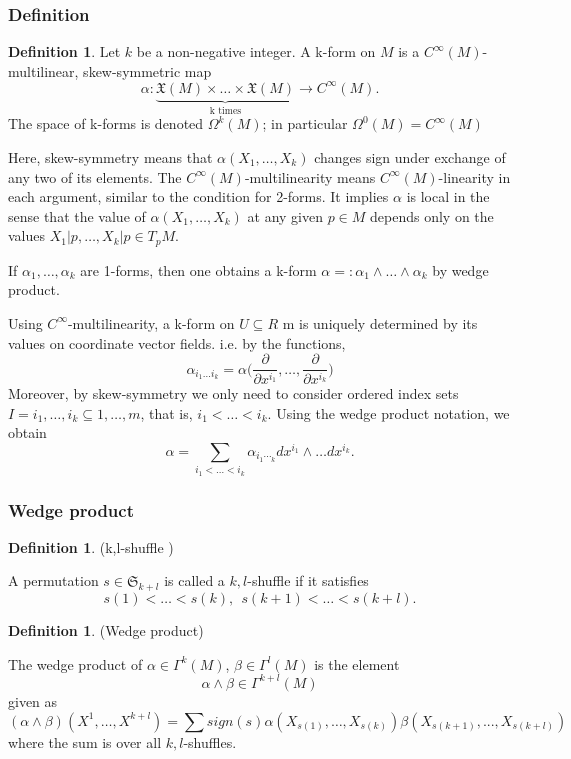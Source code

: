 \documentclass{article}
\theoremstyle{definition}
\newtheorem{defn}[theorem]{Definition}
\newenvironment{definition}
  {\vspace{8pt}\begin{mdframed}[backgroundcolor=blueish,innertopmargin=4]\begin{defn}}
  {\end{defn}\end{mdframed}\vspace{4pt}}
\begin{document}
\subsubsection{Definition}
\begin{definition}
Let $k$ be a non-negative integer. A k-form on $M$ is a $C^\infty(M)$-multilinear, skew-symmetric map
\[
    \alpha : \underbrace{\mathfrak X(M) \times \dots \times \mathfrak X(M)}_\text{k times} \rightarrow C^\infty (M).
\]
The space of k-forms is denoted $\Omega^k (M)$; in particular $\Omega^0 (M) = C^\infty(M)$
\end{definition}

Here, skew-symmetry means that $\alpha(X_1,\dots, X_k)$ changes sign under exchange of any two of its elements.  The $C^\infty(M)$-multilinearity means $C^\infty(M)$-linearity in each argument, similar to the condition for 2-forms. It implies $\alpha$ is local in the sense that the value of $\alpha(X_1,\dots,X_k)$ at any given $p \in M$ depends only on the values $X_1|p,\dots,X_k |p \in T_pM$. 

If $\alpha_1,\dots,\alpha_k$ are 1-forms, then one obtains a k-form $\alpha =: \alpha_1\wedge\dots\wedge\alpha_k$ by wedge product.

Using $C^\infty$-multilinearity, a k-form on $U \subseteq R$ m is uniquely determined by its values on coordinate vector fields. i.e. by the functions,
\[
    \alpha_{i_1\dots i_k} = \alpha \bigg ( \frac{\partial}{\partial x^{i_1}}, \dots , \frac{\partial}{ \partial x ^{i_k}} \bigg )
\]
Moreover, by skew-symmetry we only need to consider ordered index sets $I = {i_1,\dots,i_k} \subseteq {1,\dots,m}$, that is, $i_1 < \dots < i_k$. Using the wedge product notation, we obtain
\[
\alpha = \sum_{i_1<\dots<i_k} \alpha_{i_1\dotsi_k} dx^{i_1} \wedge \dots dx^{i_k}.
\]

\subsubsection{Wedge product}

\begin{definition} (k,l-shuffle )

A permutation $s \in \mathfrak S_{k+l}$ is called a $k,l$-shuffle if it satisfies
\[
   s(1) < \dots < s(k), \ \ s(k +1) < \dots < s(k +l).
\]
\end{definition}

\begin{definition} (Wedge product)

The wedge product of $\alpha  \in  \Gamma^k (M)$, $\beta  \in  \Gamma^l (M)$ is the element
\[
    \alpha \wedge \beta \in  \Gamma^{k+l} (M)
\] 
given as
\[
    (\alpha \wedge\beta )(X^1,\dots ,X^{k+l}) = \sum sign(s) \alpha (X_{s(1)},\dots ,X_{s(k)}) \beta (X_{s(k+1)},...,X_{s(k+l)})
\]
where the sum is over all $k,l$-shuffles.
\end{definition}
\end{document}

